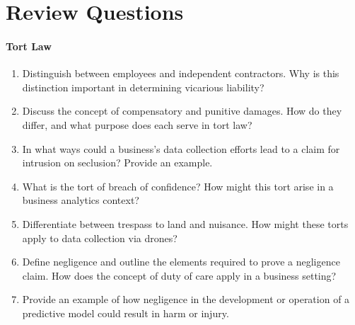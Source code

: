 \FloatBarrier

\section{Review Questions}
\paragraph*{Tort Law}
\begin{enumerate}[nosep]
	\item Distinguish between employees and independent contractors. Why is this distinction important in determining vicarious liability?
	\item Discuss the concept of compensatory and punitive damages. How do they differ, and what purpose does each serve in tort law?
	\item In what ways could a business's data collection efforts lead to a claim for intrusion on seclusion? Provide an example.
	\item What is the tort of breach of confidence? How might this tort arise in a business analytics context?
	\item Differentiate between trespass to land and nuisance. How might these torts apply to data collection via drones?
	\item Define negligence and outline the elements required to prove a negligence claim. How does the concept of duty of care apply in a business setting?
	\item Provide an example of how negligence in the development or operation of a predictive model could result in harm or injury.
\end{enumerate}
